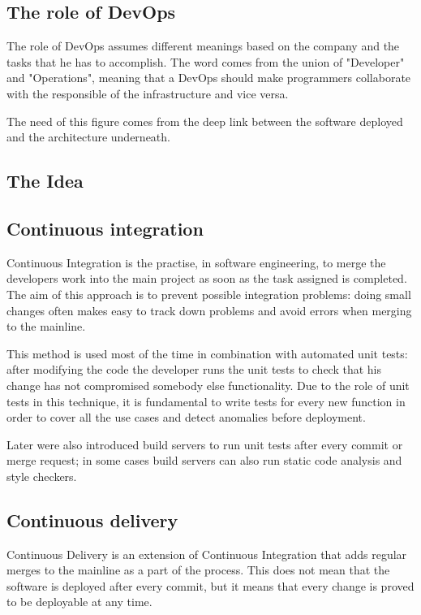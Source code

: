 \subsection{The role of DevOps}

The role of DevOps assumes different meanings based on the company and the
tasks that he has to accomplish. The word comes from the union of
"Developer" and "Operations", meaning that a DevOps should make
programmers collaborate with the responsible of the infrastructure and
vice versa.

The need of this figure comes from the deep link between the software
deployed and the architecture underneath.

\subsection{The Idea}

\subsection{Continuous integration}

Continuous Integration is the practise, in software engineering, to merge
the developers work into the main project as soon as the task assigned is
completed. The aim of this approach is to prevent possible integration
problems: doing small changes often makes easy to track down problems and
avoid errors when merging to the mainline.

This method is used most of the time in combination with automated unit tests:
after modifying the code the developer runs the unit tests to check that
his change has not compromised somebody else functionality. Due to the
role of unit tests in this technique, it is fundamental to write tests for
every new function in order to cover all the use cases and detect
anomalies before deployment.

Later were also introduced build servers to run unit tests after every commit
or merge request; in some cases build servers can also run static code analysis
and style checkers.

\subsection{Continuous delivery}

Continuous Delivery is an extension of Continuous Integration that adds regular
merges to the mainline as a part of the process. This does not mean that the
software is deployed after every commit, but it means that every change is
proved to be deployable at any time.

